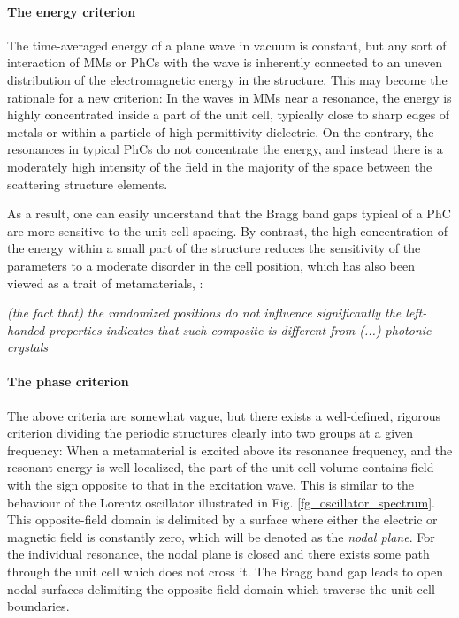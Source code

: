 \paragraph{The energy criterion} %
The time-averaged energy of a plane wave in vacuum is constant, but any sort of interaction of MMs or PhCs with the wave is inherently connected to an uneven distribution of the electromagnetic energy in the structure. This may become the rationale for a new criterion: In the waves in MMs near a resonance, the energy is highly concentrated inside a part of the unit cell, typically close to sharp edges of metals or within a particle of high-permittivity dielectric. On the contrary, the resonances in typical PhCs do not concentrate the energy, and instead there is a moderately high intensity of the field in the majority of the space between the scattering structure elements.

As a result, one can easily understand that the Bragg band gaps typical of a PhC are more sensitive to the unit-cell spacing. 
By contrast, the high concentration of the energy within a small part of the structure reduces the sensitivity of the parameters to a moderate disorder in the cell position, which has also been viewed as a trait of metamaterials, \cite{peng2007}: 
\begin{displayquote}
	\textit{(the fact that) the randomized positions do not influence significantly the left-handed properties indicates that such composite is different from (...) photonic crystals}
\end{displayquote}

\paragraph{The phase criterion} %
\label{phasecriterion}
The above criteria are somewhat vague, but there exists a well-defined, rigorous criterion dividing the periodic structures clearly into two groups at a given frequency: When a metamaterial is excited above its resonance frequency, and the resonant energy is well localized, the part of the unit cell volume contains field with the sign opposite to that in the excitation wave. This is similar to the behaviour of the Lorentz oscillator illustrated in Fig. \ref{fg_oscillator_spectrum}. %
This opposite-field domain is delimited by a surface where either the electric or magnetic field is constantly zero, which will be denoted as the \textit{nodal plane}. For the individual resonance, the nodal plane is closed and there exists some path through the unit cell which does not cross it. The Bragg band gap leads to open nodal surfaces delimiting the opposite-field domain which traverse the unit cell boundaries. %

